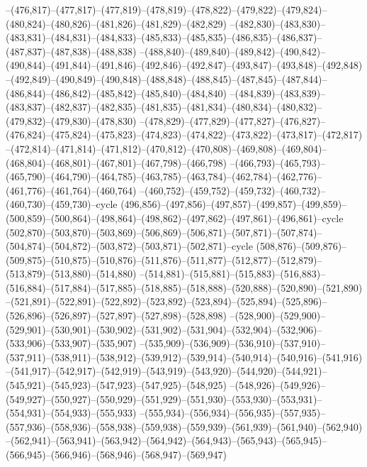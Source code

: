 --(476,817)--(477,817)--(477,819)--(478,819)--(478,822)--(479,822)--(479,824)--(480,824)--(480,826)--(481,826)--(481,829)--(482,829)
--(482,830)--(483,830)--(483,831)--(484,831)--(484,833)--(485,833)--(485,835)--(486,835)--(486,837)--(487,837)--(487,838)--(488,838)
--(488,840)--(489,840)--(489,842)--(490,842)--(490,844)--(491,844)--(491,846)--(492,846)--(492,847)--(493,847)--(493,848)--(492,848)
--(492,849)--(490,849)--(490,848)--(488,848)--(488,845)--(487,845)--(487,844)--(486,844)--(486,842)--(485,842)--(485,840)--(484,840)
--(484,839)--(483,839)--(483,837)--(482,837)--(482,835)--(481,835)--(481,834)--(480,834)--(480,832)--(479,832)--(479,830)--(478,830)
--(478,829)--(477,829)--(477,827)--(476,827)--(476,824)--(475,824)--(475,823)--(474,823)--(474,822)--(473,822)--(473,817)--(472,817)
--(472,814)--(471,814)--(471,812)--(470,812)--(470,808)--(469,808)--(469,804)--(468,804)--(468,801)--(467,801)--(467,798)--(466,798)
--(466,793)--(465,793)--(465,790)--(464,790)--(464,785)--(463,785)--(463,784)--(462,784)--(462,776)--(461,776)--(461,764)--(460,764)
--(460,752)--(459,752)--(459,732)--(460,732)--(460,730)--(459,730)--cycle
(496,856)--(497,856)--(497,857)--(499,857)--(499,859)--(500,859)--(500,864)--(498,864)--(498,862)--(497,862)--(497,861)--(496,861)--cycle
(502,870)--(503,870)--(503,869)--(506,869)--(506,871)--(507,871)--(507,874)--(504,874)--(504,872)--(503,872)--(503,871)--(502,871)--cycle
(508,876)--(509,876)--(509,875)--(510,875)--(510,876)--(511,876)--(511,877)--(512,877)--(512,879)--(513,879)--(513,880)--(514,880)
--(514,881)--(515,881)--(515,883)--(516,883)--(516,884)--(517,884)--(517,885)--(518,885)--(518,888)--(520,888)--(520,890)--(521,890)
--(521,891)--(522,891)--(522,892)--(523,892)--(523,894)--(525,894)--(525,896)--(526,896)--(526,897)--(527,897)--(527,898)--(528,898)
--(528,900)--(529,900)--(529,901)--(530,901)--(530,902)--(531,902)--(531,904)--(532,904)--(532,906)--(533,906)--(533,907)--(535,907)
--(535,909)--(536,909)--(536,910)--(537,910)--(537,911)--(538,911)--(538,912)--(539,912)--(539,914)--(540,914)--(540,916)--(541,916)
--(541,917)--(542,917)--(542,919)--(543,919)--(543,920)--(544,920)--(544,921)--(545,921)--(545,923)--(547,923)--(547,925)--(548,925)
--(548,926)--(549,926)--(549,927)--(550,927)--(550,929)--(551,929)--(551,930)--(553,930)--(553,931)--(554,931)--(554,933)--(555,933)
--(555,934)--(556,934)--(556,935)--(557,935)--(557,936)--(558,936)--(558,938)--(559,938)--(559,939)--(561,939)--(561,940)--(562,940)
--(562,941)--(563,941)--(563,942)--(564,942)--(564,943)--(565,943)--(565,945)--(566,945)--(566,946)--(568,946)--(568,947)--(569,947)
